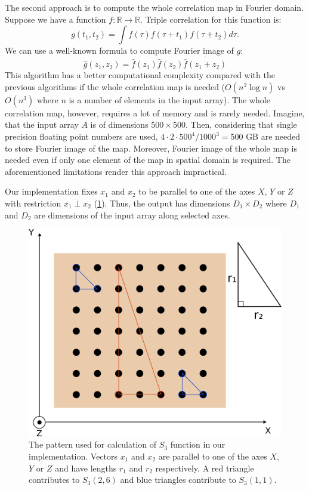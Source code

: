 \documentclass[reprint,amsmath,amssymb,aps,pre,showkeys,showpacs]{revtex4-1}
\begin{document}
The second approach is to compute the whole correlation map in Fourier
domain. Suppose we have a function
$f: \mathbb{R} \rightarrow \mathbb{R}$. Triple correlation for this function is:
\begin{equation}
  g(t_1, t_2) = \int f(\tau) f(\tau + t_1) f(\tau + t_2) d \tau.
\end{equation}
We can use a well-known formula to compute Fourier image of $g$:
\begin{equation}
  \hat{g}(z_1, z_2) = \hat{f}(z_1) \hat{f}(z_2) \overline{\hat{f}(z_1 + z_2)}
\end{equation}
This algorithm has a better computational complexity compared with the previous
algorithms if the whole correlation map is needed ($O(n^2 \log n)$ vs
$O(n^3)$ where $n$ is a number of elements in the input array). The whole
correlation map, however, requires a lot of memory and is rarely
needed. Imagine, that the input array $A$ is of dimensions $500 \times 500$.
Then, considering that single precision floating point numbers are used,
$4 \cdot 2 \cdot 500^4 / 1000^3 = 500$ GB are needed to store Fourier image of
the map. Moreover, Fourier image of the whole map is needed even if only one
element of the map in spatial domain is required. The aforementioned limitations
render this approach impractical.

Our implementation fixes $x_1$ and $x_2$ to be parallel to one of the axes $X$,
$Y$ or $Z$ with restriction $x_1 \perp x_2$ (\cref{fig:pattern}). Thus, the
output has dimensions $D_1 \times D_2$ where $D_1$ and $D_2$ are dimensions of
the input array along selected axes.
\begin{figure}[ht]
  \centering
  \includegraphics[width=0.5\linewidth]{images/pattern.png}
  \caption[]{The pattern used for calculation of $S_3$ function in our
    implementation. Vectors $x_1$ and $x_2$ are parallel to one of the axes $X$,
    $Y$ or $Z$ and have lengths $r_1$ and $r_2$ respectively. A red triangle
    contributes to $S_3(2, 6)$ and blue triangles contribute to $S_3(1, 1)$.}
  \label{fig:pattern}
\end{figure}
\end{document}
